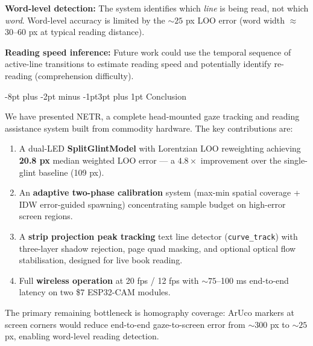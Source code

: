 \documentclass[10pt,twocolumn]{article}
\makeatletter
\renewcommand\section{\@startsection{section}{1}{\z@}%
  {-8pt plus -2pt minus -1pt}{3pt plus 1pt}%
  {\normalfont\large\bfseries}}
\makeatother
\begin{document}
\textbf{Word-level detection:} The system identifies which \textit{line} is being read, not which \textit{word}. Word-level accuracy is limited by the ${\sim}25$ px LOO error (word width $\approx$ 30--60 px at typical reading distance).

\textbf{Reading speed inference:} Future work could use the temporal sequence of active-line transitions to estimate reading speed and potentially identify re-reading (comprehension difficulty).

\section{Conclusion}

We have presented NETR, a complete head-mounted gaze tracking and reading assistance system built from commodity hardware. The key contributions are:

\begin{enumerate}
  \item A dual-LED \textbf{SplitGlintModel} with Lorentzian LOO reweighting achieving \textbf{20.8 px} median weighted LOO error — a $4.8\times$ improvement over the single-glint baseline (109 px).
  \item An \textbf{adaptive two-phase calibration} system (max-min spatial coverage + IDW error-guided spawning) concentrating sample budget on high-error screen regions.
  \item A \textbf{strip projection peak tracking} text line detector (\texttt{curve\_track}) with three-layer shadow rejection, page quad masking, and optional optical flow stabilisation, designed for live book reading.
  \item Full \textbf{wireless operation} at 20 fps / 12 fps with ${\sim}75$--100 ms end-to-end latency on two \$7 ESP32-CAM modules.
\end{enumerate}

The primary remaining bottleneck is homography coverage: ArUco markers at screen corners would reduce end-to-end gaze-to-screen error from ${\sim}300$ px to ${\sim}25$ px, enabling word-level reading detection.
\end{document}
